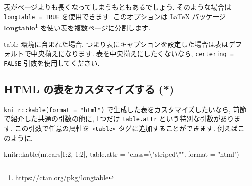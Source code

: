 \documentclass[
  11pt,
  lualatex,ja=standard,jafont=noto]{bxjsreport}
\newenvironment{Shaded}{\begin{snugshade}}{\end{snugshade}}
\newcommand{\AttributeTok}[1]{\textcolor[rgb]{0.77,0.63,0.00}{#1}}
\newcommand{\DecValTok}[1]{\textcolor[rgb]{0.00,0.00,0.81}{#1}}
\newcommand{\FunctionTok}[1]{\textcolor[rgb]{0.00,0.00,0.00}{#1}}
\newcommand{\NormalTok}[1]{#1}
\newcommand{\SpecialCharTok}[1]{\textcolor[rgb]{0.00,0.00,0.00}{#1}}
\newcommand{\StringTok}[1]{\textcolor[rgb]{0.31,0.60,0.02}{#1}}
\renewcommand{\href}[2]{#2\footnote{\url{#1}}}
\begin{document}
表がページよりも長くなってしまうもともあるでしょう. そのような場合は \texttt{longtable = TRUE} を使用できます. このオプションは LaTeX パッケージ \href{https://ctan.org/pkg/longtable}{\textbf{longtable}} を使い表を複数ページに分割します.

table 環境に含まれた場合, つまり表にキャプションを設定した場合は表はデフォルトで中央揃えになります. 表を中央揃えにしたくないなら, \texttt{centering = FALSE} 引数を使用してください.

\hypertarget{customize-html-tables}{%
\subsection{HTML の表をカスタマイズする (*)}\label{customize-html-tables}}

\texttt{knitr::kable(format = "html")} で生成した表をカスタマイズしたいなら, 前節で紹介した共通の引数の他に, 1つだけ \texttt{table.attr} という特別な引数があります. この引数で任意の属性を \texttt{\textless{}table\textgreater{}} タグに追加することができます. 例えばこのように.

\begin{Shaded}
\begin{Highlighting}[numbers=left,,]
\NormalTok{knitr}\SpecialCharTok{::}\FunctionTok{kable}\NormalTok{(mtcars[}\DecValTok{1}\SpecialCharTok{:}\DecValTok{2}\NormalTok{, }\DecValTok{1}\SpecialCharTok{:}\DecValTok{2}\NormalTok{], }\AttributeTok{table.attr =} \StringTok{"class=}\SpecialCharTok{\textbackslash{}"}\StringTok{striped}\SpecialCharTok{\textbackslash{}"}\StringTok{"}\NormalTok{, }
  \AttributeTok{format =} \StringTok{"html"}\NormalTok{)}
\end{Highlighting}
\end{Shaded}
\end{document}
